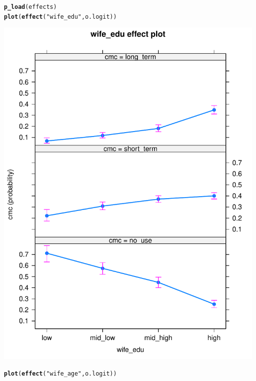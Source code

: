 \documentclass[onesided]{article}\usepackage[]{graphicx}\usepackage[]{color}
\makeatletter
\def\maxwidth{ %
  \ifdim\Gin@nat@width>\linewidth
    \linewidth
  \else
    \Gin@nat@width
  \fi
}
\newcommand{\hlstr}[1]{\textcolor[rgb]{0.192,0.494,0.8}{#1}}%
\newcommand{\hlstd}[1]{\textcolor[rgb]{0.345,0.345,0.345}{#1}}%
\newcommand{\hlkwd}[1]{\textcolor[rgb]{0.737,0.353,0.396}{\textbf{#1}}}%
\newenvironment{kframe}{%
 \def\at@end@of@kframe{}%
 \ifinner\ifhmode%
  \def\at@end@of@kframe{\end{minipage}}%
  \begin{minipage}{\columnwidth}%
 \fi\fi%
 \def\FrameCommand##1{\hskip\@totalleftmargin \hskip-\fboxsep
 \colorbox{shadecolor}{##1}\hskip-\fboxsep
     \hskip-\linewidth \hskip-\@totalleftmargin \hskip\columnwidth}%
 \MakeFramed {\advance\hsize-\width
   \@totalleftmargin\z@ \linewidth\hsize
   \@setminipage}}%
 {\par\unskip\endMakeFramed%
 \at@end@of@kframe}
\newenvironment{knitrout}{}{} %
\makeatother
\begin{document}
\begin{knitrout}
\color{fgcolor}\begin{kframe}
\begin{alltt}
\hlkwd{p_load}\hlstd{(effects)}
\hlkwd{plot}\hlstd{(}\hlkwd{effect}\hlstd{(}\hlstr{"wife_edu"}\hlstd{, o.logit))}
\end{alltt}
\end{kframe}

{\centering \includegraphics[width=\maxwidth]{figure/pp-1} 

}


\begin{kframe}\begin{alltt}
\hlkwd{plot}\hlstd{(}\hlkwd{effect}\hlstd{(}\hlstr{"wife_age"}\hlstd{, o.logit))}
\end{alltt}
\end{kframe}


\end{knitrout}
\end{document}
